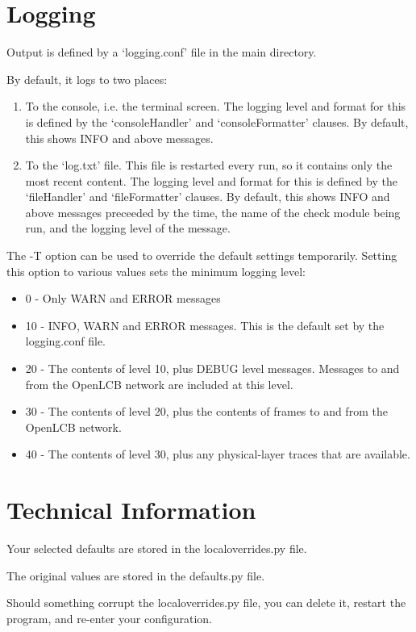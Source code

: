 \section{Logging}

Output is defined by a `logging.conf' file in the main directory.

By default, it logs to two places:
\begin{enumerate}
\item To the console, i.e. the terminal screen.  The logging level and format
for this is defined by the `consoleHandler' and `consoleFormatter' clauses.
By default, this shows INFO and above messages.
\item To the `log.txt' file. This file is restarted every run, so it 
contains only the most recent content. The logging level and format
for this is defined by the `fileHandler' and `fileFormatter' clauses.
By default, this shows INFO and above messages preceeded by the 
time, the name of the check module being run, and the logging level of the message.
\end{enumerate}

The -T option can be used to override the default settings temporarily.  
Setting this option to various values sets the minimum logging level:
\begin{itemize}
\item 0 - Only WARN and ERROR messages
\item 10 -  INFO, WARN and ERROR messages.  This is the default set by the logging.conf file.
\item 20 - The contents of level 10, plus DEBUG level messages. 
        Messages to and from the OpenLCB network are included at this level.
\item 30 - The contents of level 20, plus the contents of frames to and from the 
        OpenLCB network.
\item 40 - The contents of level 30, plus any physical-layer traces that are available.
\end{itemize}

\section{Technical Information}

Your selected defaults are stored in the localoverrides.py file.

The original values are stored in the defaults.py file.

Should something corrupt the localoverrides.py file,
you can delete it, restart the program, and re-enter your configuration.

